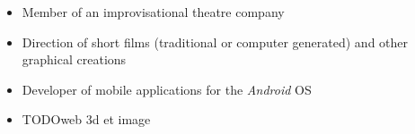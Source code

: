 \documentclass[a4paper,11pt]{article} %
\newcommand{\trad}[2]{#1}
\begin{document}
	\begin{itemize}
	\item \trad{Member of an improvisational theatre company}                   								{Membre d'une troupe d'improvisation théatrale}
	\item \trad{Direction of short films (traditional or computer generated) and other graphical creations}   	{Réalisation de courts métrages et autres créations graphiques} %
	\item \trad{Developer of mobile applications for the \textit{Android} OS}  									{Développement d'applications pour mobiles \textit{Android}}
	\item \trad{TODOweb 3d et image}  																			{Suivi de l'actualité des domaines du web et de l'image de synthèse.} 
	\end{itemize}

	

\end{document}
